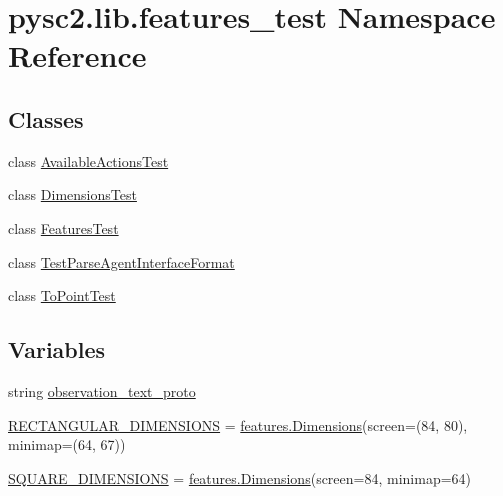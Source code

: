 \hypertarget{namespacepysc2_1_1lib_1_1features__test}{}\section{pysc2.\+lib.\+features\+\_\+test Namespace Reference}
\label{namespacepysc2_1_1lib_1_1features__test}
\subsection*{Classes}
\begin{DoxyCompactItemize}
\item 
class \mbox{\hyperlink{classpysc2_1_1lib_1_1features__test_1_1_available_actions_test}{Available\+Actions\+Test}}
\item 
class \mbox{\hyperlink{classpysc2_1_1lib_1_1features__test_1_1_dimensions_test}{Dimensions\+Test}}
\item 
class \mbox{\hyperlink{classpysc2_1_1lib_1_1features__test_1_1_features_test}{Features\+Test}}
\item 
class \mbox{\hyperlink{classpysc2_1_1lib_1_1features__test_1_1_test_parse_agent_interface_format}{Test\+Parse\+Agent\+Interface\+Format}}
\item 
class \mbox{\hyperlink{classpysc2_1_1lib_1_1features__test_1_1_to_point_test}{To\+Point\+Test}}
\end{DoxyCompactItemize}
\subsection*{Variables}
\begin{DoxyCompactItemize}
\item 
string \mbox{\hyperlink{namespacepysc2_1_1lib_1_1features__test_adce0a02e86e8ca843a83f901dbb707fc}{observation\+\_\+text\+\_\+proto}}
\item 
\mbox{\hyperlink{namespacepysc2_1_1lib_1_1features__test_ae8989bfb42e5bf07b18085dd10a25410}{R\+E\+C\+T\+A\+N\+G\+U\+L\+A\+R\+\_\+\+D\+I\+M\+E\+N\+S\+I\+O\+NS}} = \mbox{\hyperlink{classpysc2_1_1lib_1_1features_1_1_dimensions}{features.\+Dimensions}}(screen=(84, 80), minimap=(64, 67))
\item 
\mbox{\hyperlink{namespacepysc2_1_1lib_1_1features__test_a88ac2c6cec70b80ef99c15b0c468ca8e}{S\+Q\+U\+A\+R\+E\+\_\+\+D\+I\+M\+E\+N\+S\+I\+O\+NS}} = \mbox{\hyperlink{classpysc2_1_1lib_1_1features_1_1_dimensions}{features.\+Dimensions}}(screen=84, minimap=64)
\end{DoxyCompactItemize}


